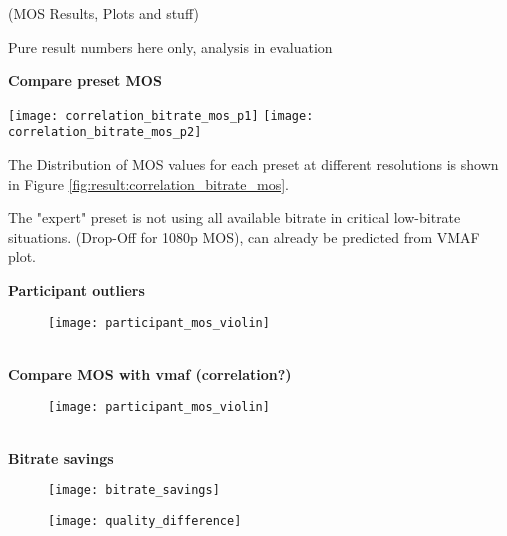 (MOS Results, Plots and stuff)

Pure result numbers here only, analysis in evaluation

\textbf{Compare preset MOS}

\begin{figure*}[t!]
	\centering
	\texttt{[image: correlation\_bitrate\_mos\_p1]}
	\texttt{[image: correlation\_bitrate\_mos\_p2]}
	\caption{Correlation between bitrate and MOS for both encoding presets. The center line represents a median and the outer line the 25th and 75th percentile of MOS for the 6 sequences.}
	\label{fig:result:correlation_bitrate_mos}
\end{figure*}

The Distribution of MOS values for each preset at different resolutions is shown in Figure \ref{fig:result:correlation_bitrate_mos}.

The "expert" preset is not using all available bitrate in critical low-bitrate situations. (Drop-Off for 1080p MOS), can already be predicted from VMAF plot.


\textbf{Participant outliers}
\begin{figure}[bht!]
	\centering
	\texttt{[image: participant\_mos\_violin]}
	\caption{}
	\label{fig:result:participant_violin}
\end{figure}
\\

\textbf{Compare MOS with vmaf (correlation?)}
\begin{figure}[bht!]
	\centering
	\texttt{[image: participant\_mos\_violin]}
	\caption{}
	\label{fig:result:participant_violin}
\end{figure}
\\

\textbf{Bitrate savings}
\begin{figure}[bht!]
	\centering
	\texttt{[image: bitrate\_savings]}
	\caption{}
	\label{fig:result:bitrate_savings}
\end{figure}
\begin{figure}[bht!]
	\centering
	\texttt{[image: quality\_difference]}
	\caption{}
	\label{fig:result:quality_difference}
\end{figure}